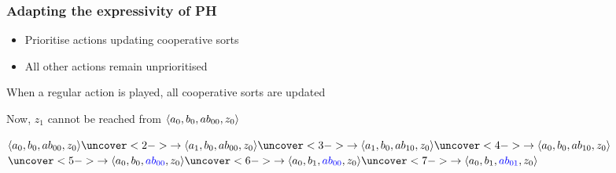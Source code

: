 \begin{frame}
  \frametitle{Adapting the expressivity of PH}

\begin{itemize}
  \item Prioritise actions updating cooperative sorts
  \item All other actions remain unprioritised
\end{itemize}
\F When a regular action is played, all cooperative sorts are updated

\medskip
Now, $z_1$ cannot be reached from $\mbox{$\langle a_0, b_0, ab_{00}, z_0 \rangle$}$

\medskip
$ \PHstate{a_0, b_0, ab_{00}, z_0}
  \uncover<2->{\rightarrow\PHstate{a_1, b_0, ab_{00}, z_0}}
  \uncover<3->{\rightarrow\PHstate{a_1, b_0, ab_{10}, z_0}}
  \uncover<4->{\rightarrow\PHstate{a_0, b_0, ab_{10}, z_0}}$
\\ \qquad
$ \uncover<5->{\rightarrow\PHstate{a_0, b_0, \ex{ab_{00}}, z_0}}
  \uncover<6->{\rightarrow\PHstate{a_0, b_1, \ex{ab_{00}}, z_0}}
  \uncover<7->{\rightarrow\PHstate{a_0, b_1, \ex{ab_{01}}, z_0}}$

\begin{center}\end{center}

\end{frame}

